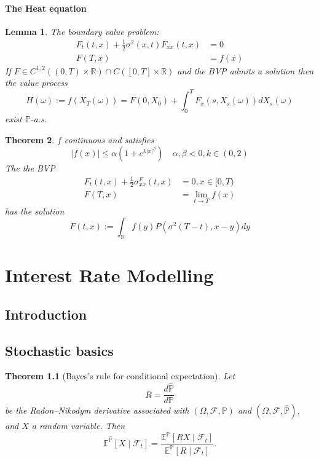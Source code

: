 \documentclass[a4paper,11pt]{book}
\newtheorem{theorem}{Theorem}[section]
\newtheorem{lemma}[theorem]{Lemma}
\theoremstyle{definition}
\theoremstyle{remark}
\begin{document}
\subsubsection*{The Heat equation}
\begin{lemma}
	The boundary value problem:
	\begin{align}
		F_t(t, x) + \frac{1}{2} \sigma^2(x, t) F_{xx}(t, x) &= 0\\
		F(T, x) &= f(x)
	\end{align}
	If $F \in C^{1, 2}((0, T) \times \mathbb{R}) \cap C([0, T] \times \mathbb{R})$ and the BVP admits a solution then the value process
	\begin{equation*}
		H(\omega) := f(X_T(\omega)) = F(0, X_0) + \int_0^T F_x (s, X_s(\omega)) dX_s(\omega)
	\end{equation*}
	exist $\mathbb{P}$-a.s.
\end{lemma}

\begin{theorem}
	$f$ continuous and satisfies
	\begin{equation*}
		|f(x)| \leq \alpha ( 1 + e^{k|x|^\beta}) \quad \alpha , \beta < 0, k \in (0, 2)
	\end{equation*}
	The the BVP 
	\begin{align}
		F_t(t, x) + \frac{1}{2} \sigma^ F_{xx}(t, x) &= 0, x \in [0, T)\\
		F(T, x) &= \lim_{t \rightarrow T}f(x)
	\end{align}
	has the solution
	\begin{equation*}
		F(t,x) := \int_\mathbb{R} f(y) P(\sigma^2(T - t), x-y)dy
	\end{equation*}
\end{theorem}



\chapter{Interest Rate Modelling}
\section{Introduction}
\section{Stochastic basics}

\begin{theorem}[Bayes's rule for conditional expectation]
Let 
\[
R = \frac{d\mathbb{\hat{P}}}{d\mathbb{P}}
\]
be the Radon–Nikodym derivative associated with 
\((\Omega, \mathcal{F}, \mathbb{P})\) and \((\Omega, \mathcal{F}, \mathbb{\hat{P}})\),
and \(X\) a random variable. Then
\[
\mathbb{E}^{\mathbb{\hat{P}}}[X \mid \mathcal{F}_t] = 
\frac{\mathbb{E}^{\mathbb{P}}[R X \mid \mathcal{F}_t]}{\mathbb{E}^{\mathbb{P}}[R \mid \mathcal{F}_t]}.
\]
\end{theorem}
\end{document}

